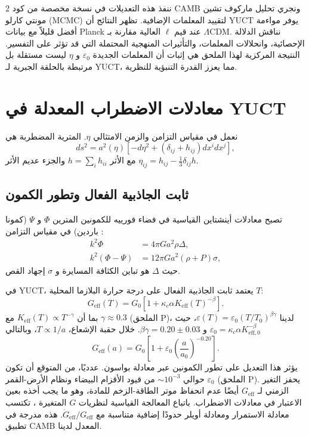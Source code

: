 \documentclass[11pt,a4paper]{article}
\begin{document}
\begin{multicols}{2}
		ننفذ هذه التعديلات في نسخة مخصصة من كود CAMB ونجري تحليل ماركوف تشين مونتي كارلو (MCMC) لتقييد المعلمات الإضافية. تظهر النتائج أن YUCT يوفر مواءمة أفضل قليلاً مع بيانات Planck عند قيم $\ell$ العالية مقارنة بـ $\Lambda$CDM. نناقش الدلالة الإحصائية، وانحلالات المعلمات، والتأثيرات المنهجية المحتملة التي قد تؤثر على التفسير. النتيجة المركزية لهذا الملحق هي إثبات أن المعلمات الجديدة $\varepsilon_0$ و $\eta$ ليست مستقلة بل مرتبطة بالحلقة الجبرية لـ YUCT، مما يعزز القدرة التنبؤية للنظرية.
		
		\section{معادلات الاضطراب المعدلة في YUCT}
		
		نعمل في مقياس التزامن والزمن الامتثالي $\eta$. المترية المضطربة هي
		\begin{equation}
			ds^2 = a^2(\eta)\left[ -d\eta^2 + (\delta_{ij} + h_{ij}) dx^i dx^j \right],
		\end{equation}
		مع الأثر $h = \sum_i h_{ii}$ والجزء عديم الأثر $\eta_{ij} = h_{ij} - \frac{1}{3}\delta_{ij}h$.
		
		\subsection{ثابت الجاذبية الفعال وتطور الكمون}
		
		تصبح معادلات أينشتاين القياسية في فضاء فورييه للكمونين المترين $\Phi$ و $\Psi$ (كمونا باردين) في مقياس التزامن \cite{Ma1995}:
		\begin{align}
			k^2 \Phi &= 4\pi G a^2 \rho \Delta, \\
			k^2 (\Phi - \Psi) &= 12\pi G a^2 (\rho+P) \sigma,
		\end{align}
		حيث $\Delta$ هو تباين الكثافة المسايرة و $\sigma$ إجهاد القص.
		
		في YUCT، يعتمد ثابت الجاذبية الفعال على درجة حرارة البلازما المحلية $T$:
		\begin{equation}
			G_{\mathrm{eff}}(T) = G_0\left[1 + \kappa_c \alpha K_{\mathrm{eff}}(T)^{-\beta}\right].
			\label{eq:Geff}
		\end{equation}
		بما أن $K_{\mathrm{eff}}(T) \propto T^{-\gamma}$ مع $\gamma \approx 0.3$ (الملحق P)، لدينا $\varepsilon(T) = \varepsilon_0 (T/T_0)^{\beta\gamma}$، حيث $\varepsilon_0 = \kappa_c \alpha K_{\mathrm{eff},0}^{-\beta}$ و $\beta\gamma = 0.20 \pm 0.03$. خلال حقبة الإشعاع، $T \propto 1/a$، وبالتالي
		\begin{equation}
			G_{\mathrm{eff}}(a) = G_0\left[1 + \varepsilon_0 \left(\frac{a}{a_0}\right)^{-0.20}\right].
			\label{eq:Geff_a}
		\end{equation}
		يؤثر هذا التعديل على تطور الكمونين عبر معادلة بواسون. عدديًا، من المتوقع أن تكون $\varepsilon_0$ حوالي $\sim 10^{-3}$ من قيود الأقزام البيضاء ونظام الأرض-القمر (الملحق P). يحفز التغير الزمني لـ $G_{\mathrm{eff}}$ أيضًا عدم انحفاظ موتر الطاقة-الزخم للمادة، وهو ما يجب أخذه بعين الاعتبار في معادلات الاضطراب. باتباع المعالجة القياسية لنظريات $G$ المتغيرة \cite{Uzan2011}، تكتسب معادلة الاستمرار ومعادلة أويلر حدودًا إضافية متناسبة مع $\dot{G}_{\mathrm{eff}}/G_{\mathrm{eff}}$. هذه مدرجة في تطبيق CAMB المعدل لدينا.
		

\end{multicols}
\end{document}
